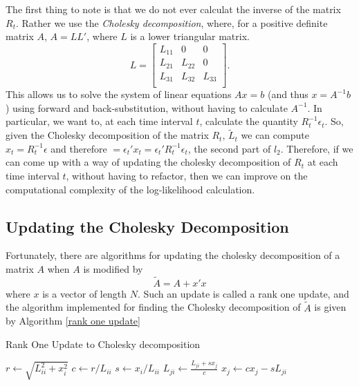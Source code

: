 \documentclass{article} %
\numberwithin{equation}{section} %
\numberwithin{figure}{section} %
\numberwithin{table}{section} %
\begin{document}
The first thing to note is that we do not ever calculat the inverse of the matrix $R_t$. Rather we use the \textit{Cholesky decomposition}, where, for a positive definite matrix $A$, $A = LL'$, where $L$ is a lower triangular matrix.
\begin{equation}
  L=
    \begin{bmatrix}
      L_{11} & 0      & 0       \\
      L_{21} & L_{22} & 0       \\
      L_{31} & L_{32} & L_{33}  \\
    \end{bmatrix}.
\end{equation}
This allows us to solve the system of linear equations $Ax = b$ (and thus $x = A^{-1}b$) using forward and back-substitution, without having to calculate $A^{-1}$. In particular, we want to, at each time interval $t$, calculate the quantity $R_t^{-1}\epsilon_t$. So, given the Cholesky decomposition of the matrix $R_t$, $\tilde{L}_t$ we can compute $x_t = R_t^{-1}\epsilon$ and therefore $ = \epsilon_t'x_t = \epsilon_t'R_t^{-1}\epsilon_t$, the second part of $l_2$. Therefore, if we can come up with a way of updating the cholesky decomposition of $R_t$ at each time interval $t$, without having to refactor, then we can improve on the computational complexity of the log-likelihood calculation.

\subsection{Updating the Cholesky Decomposition}

Fortunately, there are algorithms for updating the cholesky decomposition of a matrix $A$ when $A$ is modified by
\begin{equation}
\tilde{A} = A + x'x
\end{equation}
where $x$ is a vector of length $N$. Such an update is called a rank one update, and the algorithm implemented for finding the Cholesky decomposition of $\tilde{A}$ is given by Algorithm \ref{rank one update}

\begin{algorithm}
\caption{Rank One Update to Cholesky decomposition}\label{rank one update}
\begin{algorithmic}[1]
\State $r \gets \sqrt{L_{ii}^2 + x_i^2}$
\State $c \gets r / L_{ii}$
\State $s \gets x_i/L_{ii}$
\State $L_{ji} \gets \frac{L_{ji} + sx_{j}}{c}$
\State $x_j \gets c x_j - sL_{ji}$
\EndFor
\EndFor
\EndProcedure
\end{algorithmic}
\end{algorithm}
\end{document}
